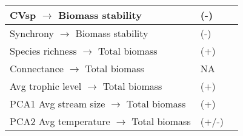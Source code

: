 \begin{tabular}{| m{7cm}| m{2cm}| m{4cm}|}
    \hline
    CVsp $\to$ Biomass stability & (-) & \citet{thibaut_understanding_2013}\\
    \hline
    Synchrony $\to$ Biomass stability & (-) & \citet{thibaut_understanding_2013}\\
    \hline
    Species richness $\to$ Total biomass & (+) & \citet{schneider_animal_2016}\\
    \hline
    Connectance $\to$ Total biomass & NA & \citet{wang_biodiversity_2018}\\
    \hline
    Avg trophic level $\to$ Total biomass & (+) & \citet{wang_biodiversity_2018}\\
    \hline
    PCA1 Avg stream size $\to$ Total biomass & (+) & \citet{post_ecosystem_2000, doi_resource_2009, @allan_stream_2007}\\
    \hline
    PCA2 Avg temperature $\to$ Total biomass & (+/-) & \citep{ogorman_unexpected_2017}\\
    \hline
\end{tabular}
